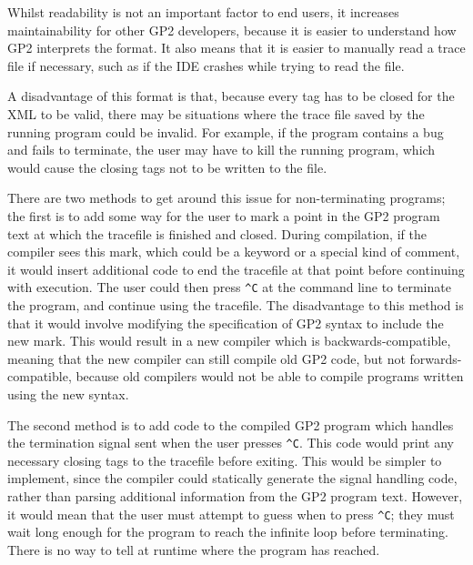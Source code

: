 \documentclass[authoryearcitations]{UoYCSproject}
\begin{document}
Whilst readability is not an important factor to end users, it increases
maintainability for other GP2 developers, because it is easier to understand
how GP2 interprets the format. It also means that it is easier to manually read
a trace file if necessary, such as if the IDE crashes while trying to read the
file.

A disadvantage of this format is that, because every tag has to be closed for
the XML to be valid, there may be situations where the trace file saved by the
running program could be invalid. For example, if the program contains a bug and
fails to terminate, the user may have to kill the running program, which would cause
the closing tags not to be written to the file.

There are two methods to get around this issue for non-terminating programs; the
first is to add some way for the user to mark a point in the GP2 program text
at which the tracefile is finished and closed. During compilation, if the compiler
sees this mark, which could be a keyword or a special kind of comment, it would
insert additional code to end the tracefile at that point before continuing with
execution. The user could then press \texttt{\textasciicircum C} at the
command line to terminate the program, and continue using the tracefile.
The disadvantage to this method is that it would involve modifying the specification
of GP2 syntax to include the new mark. This would result in a new compiler which is
backwards-compatible, meaning that the new compiler can still compile old GP2 code,
but not forwards-compatible, because old compilers would not be able to compile
programs written using the new syntax.

The second method is to add code to the compiled GP2 program which handles the
termination signal sent when the user presses \texttt{\textasciicircum C}. This
code would print any necessary closing tags to the tracefile before exiting. This
would be simpler to implement, since the compiler could statically generate the
signal handling code, rather than parsing additional information from the GP2
program text. However, it would mean that the user must attempt to guess when to
press \texttt{\textasciicircum C}; they must wait long enough for the program to
reach the infinite loop before terminating. There is no way to tell at runtime
where the program has reached.

\clearpage

\end{document}
